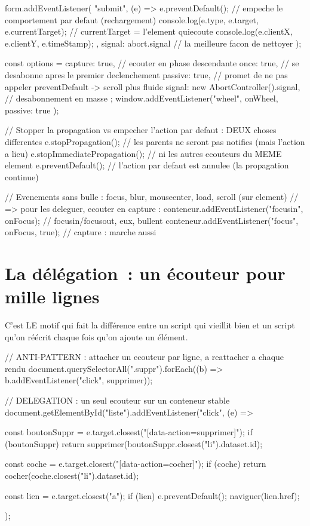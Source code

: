 \begin{codejs}
form.addEventListener(
  "submit",
  (e) => {
    e.preventDefault();                  // empeche le comportement par defaut (rechargement)
    console.log(e.type, e.target, e.currentTarget);   // currentTarget = l'element quiecoute
    console.log(e.clientX, e.clientY, e.timeStamp);
  },
  { signal: abort.signal }               // la meilleure facon de nettoyer
);

const options = {
  capture: true,        // ecouter en phase descendante
  once: true,           // se desabonne apres le premier declenchement
  passive: true,        // promet de ne pas appeler preventDefault -> scroll plus fluide
  signal: new AbortController().signal,   // desabonnement en masse
};
window.addEventListener("wheel", onWheel, { passive: true });

// Stopper la propagation vs empecher l'action par defaut : DEUX choses differentes
e.stopPropagation();        // les parents ne seront pas notifies (mais l'action a lieu)
e.stopImmediatePropagation(); // ni les autres ecouteurs du MEME element
e.preventDefault();         // l'action par defaut est annulee (la propagation continue)

// Evenements sans bulle : focus, blur, mouseenter, load, scroll (sur element)
// => pour les deleguer, ecouter en capture :
conteneur.addEventListener("focusin", onFocus);      // focusin/focusout, eux, bullent
conteneur.addEventListener("focus", onFocus, true);  // capture : marche aussi
\end{codejs}

\section{La d\'el\'egation~: un \'ecouteur pour mille lignes}

C'est LE motif qui fait la diff\'erence entre un script qui vieillit bien et un script
qu'on r\'e\'ecrit chaque fois qu'on ajoute un \'el\'ement.

\begin{codejs}
// ANTI-PATTERN : attacher un ecouteur par ligne, a reattacher a chaque rendu
document.querySelectorAll(".suppr").forEach((b) => b.addEventListener("click", supprimer));

// DELEGATION : un seul ecouteur sur un conteneur stable
document.getElementById("liste").addEventListener("click", (e) => {
  const boutonSuppr = e.target.closest("[data-action=supprimer]");
  if (boutonSuppr) return supprimer(boutonSuppr.closest("li").dataset.id);

  const coche = e.target.closest("[data-action=cocher]");
  if (coche) return cocher(coche.closest("li").dataset.id);

  const lien = e.target.closest("a");
  if (lien) { e.preventDefault(); naviguer(lien.href); }
});
\end{codejs}

